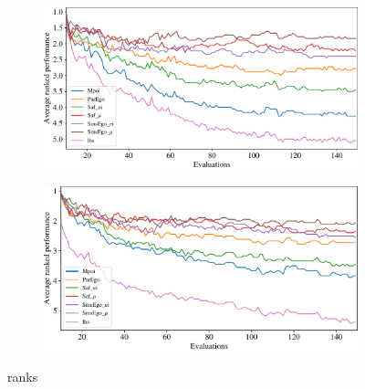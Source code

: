 \documentclass[conference]{IEEEtran}
\begin{document}
\begin{figure}[t]
\begin{subfigure}[b]{\columnwidth}
         \centering
         \includegraphics[width=\columnwidth]{figures/_ranked_performance_plot_hv.pdf}
     \end{subfigure}
\begin{subfigure}[b]{\columnwidth}
         \centering
         \includegraphics[width=\columnwidth]{figures/_ranked_performance_plot_igd.pdf}
     \end{subfigure}
\caption{ranks}
\label{fig: ranked_plots}
\end{figure}

    
\end{document}
